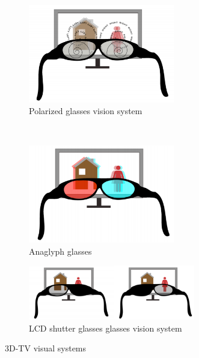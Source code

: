 \begin{figure}[h!]
\centering
\begin{subfigure}[]{0.4\textwidth}
\centering
\includegraphics[width=0.7\textwidth]{./img/tv1.png}
\caption{\scriptsize{Polarized glasses vision system}}
\label{fig:tv1}
\end{subfigure}%
~ %
\begin{subfigure}[]{0.4\textwidth}
\centering
\includegraphics[width=0.7\textwidth]{./img/tv3.png}
\caption{\scriptsize{Anaglyph glasses}}
\label{fig:tv3}
\end{subfigure} 
\begin{subfigure}[]{0.7\textwidth}
\centering
\includegraphics[width=0.8\textwidth]{./img/tv2.png}
\caption{\scriptsize{LCD shutter glasses glasses vision system}}
\label{fig:tv2}
\end{subfigure}%
\caption{\small{3D-TV visual systems}}
\end{figure}
